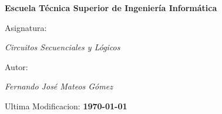 \begin{titlepage}
        \centering
        {\bfseries\LARGE Escuela Técnica Superior de Ingeniería Informática\par}
        \vspace{1cm}
        {\Large Asignatura: \par \textit{Circuitos Secuenciales y Lógicos} \par}
        \vspace{1cm}
        {\Large Autor: \par \textit{Fernando José Mateos Gómez} \par}
        \vspace{2cm}
        {\Large Ultima Modificacion: \textbf{\today} \par}
        \vspace{2cm}
\end{titlepage}
\restoregeometry
